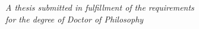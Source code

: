 \begin{titlepage}
    \begin{addmargin}[-1cm]{-3cm}
    \begin{center}
        \large

        \hfill
        \vfill

        \begingroup
        \huge
        \color{webbrown}\spacedallcaps{\myTitle} \\ \bigskip
        \endgroup

        \begingroup
          \Large
          \textit{\mySubtitle}
        \endgroup


        \bigskip
        \bigskip
        \bigskip

        \begingroup
        \huge
        \endgroup

        \bigskip
        \bigskip
        \bigskip

        \begingroup
        \Large
        \spacedlowsmallcaps{\myName} \\ \medskip
        \endgroup

        \bigskip
        \bigskip
        \bigskip
        \bigskip
        \bigskip
        
        \vfill
        \large \textit{A thesis submitted in fulfillment of the requirements\\ for the degree of Doctor of Philosophy}\\[0.3cm] %

        
        
         \bigskip
        \bigskip
        \bigskip
        \bigskip
        \bigskip
        
        \begingroup
        \normalsize
        \myDepartment \\
         \myFaculty \\
        \myUni \\
        \endgroup


        \vfill

    \end{center}
  \end{addmargin}
\end{titlepage}